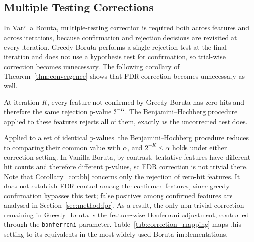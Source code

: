 \documentclass[runningheads]{llncs}
\begin{document}
\subsection{Multiple Testing Corrections}
\label{sec:method:corrections}


In Vanilla Boruta, multiple-testing correction is required both across features and across iterations, because confirmation and rejection decisions are revisited at every iteration. Greedy Boruta performs a single rejection test at the final iteration and does not use a hypothesis test for confirmation, so trial-wise correction becomes unnecessary. The following corollary of Theorem~\ref{thm:convergence} shows that FDR correction becomes unnecessary as well.

\begin{corollary}
\label{cor:bh}
At iteration $K$, every feature not confirmed by Greedy Boruta has zero hits and therefore the same rejection p-value $2^{-K}$. The Benjamini--Hochberg procedure~\cite{benjamini1995controlling} applied to these features rejects all of them, exactly as the uncorrected test does.
\end{corollary}

Applied to a set of identical p-values, the Benjamini--Hochberg procedure reduces to comparing their common value with $\alpha$, and $2^{-K}\leq\alpha$ holds under either correction setting. In Vanilla Boruta, by contrast, tentative features have different hit counts and therefore different p-values, so FDR correction is not trivial there. Note that Corollary~\ref{cor:bh} concerns only the rejection of zero-hit features. It does not establish FDR control among the confirmed features, since greedy confirmation bypasses this test; false positives among confirmed features are analysed in Section~\ref{sec:method:fpr}. As a result, the only non-trivial correction remaining in Greedy Boruta is the feature-wise Bonferroni adjustment, controlled through the \texttt{bonferroni} parameter. Table~\ref{tab:correction_mapping} maps this setting to its equivalents in the most widely used Boruta implementations.
\end{document}
